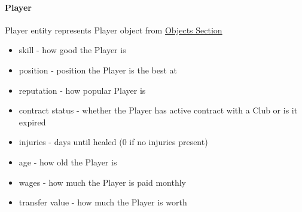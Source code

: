 \documentclass{report}
\begin{document}
\paragraph{Player}
Player entity represents Player object from \hyperref[Objects Section]{Objects Section}
\begin{itemize}
    \item skill - how good the Player is
    \item position - position the Player is the best at
    \item reputation - how popular Player is
    \item contract status - whether the Player has active contract with a Club or is it expired
    \item injuries - days until healed (0 if no injuries present)
    \item age - how old the Player is
    \item wages - how much the Player is paid monthly
    \item transfer value - how much the Player is worth
\end{itemize}
\end{document}
